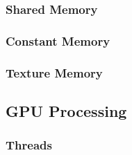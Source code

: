 \subsubsection{Shared Memory}\label{gpu:ssec:sm}
%
\subsubsection{Constant Memory}\label{gpu:ssec:cm}
%
\subsubsection{Texture Memory}\label{gpu:ssec:tm}
\subsection{GPU Processing}\label{gpu:sec:proc}
%
\subsubsection{Threads}\label{gpu:ssec:thr}
